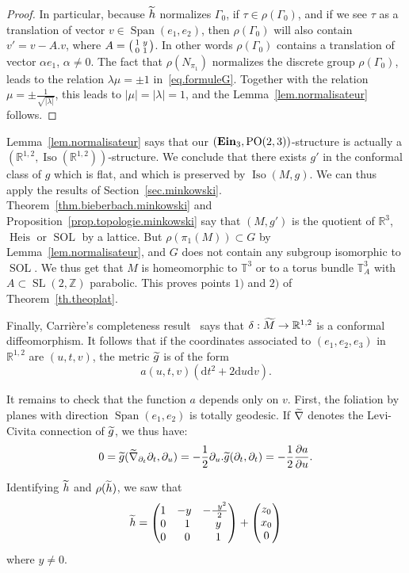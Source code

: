 \documentclass[11pt]{article}
\theoremstyle{definition}
\numberwithin{equation}{section}
\numberwithin{figure}{section}
\numberwithin{table}{section}
\DeclareMathOperator{\Iso}{Iso}
\DeclareMathOperator{\SL}{SL}
\DeclareMathOperator{\Sol}{SOL}
\DeclareMathOperator{\ein}{{\bf Ein}_3}
\DeclareMathOperator{\Span}{Span}
\DeclareMathOperator{\Heis}{Heis}
\newcommand{\tm}{\tilde{{M}}}
\newcommand{\tth}{\tilde{h}}
\newcommand*\TT{\mathbb{T}}
\newcommand*\RR{\mathbb{R}}
\newcommand*\ZZ{\mathbb{Z}}
\DeclareMathOperator{\POop}{PO}
\newcommand{\PO}{{\POop(2,3)}}
\let\oldtilde\tilde
\renewcommand*\tilde[1]{\mathchoice{\widetilde{#1}}{\widetilde{#1}}{\widetilde{#1}}{\oldtilde{#1}}}
\newenvironment{smallpmatrix}{\left(\begin{smallmatrix}}{\end{smallmatrix}\right)}
\newcommand*{\dd}{\mathrm{d}}
\newcommand*{\dt}{\dd t}
\newcommand*{\du}{\dd u}
\newcommand*{\dv}{\dd v}
\begin{document}
\begin{proof}
In particular, because $\tth$ normalizes $\Gamma_0$, if $\tau \in \rho(\Gamma_0)$, and if we see $\tau$ as a translation of vector $v \in \Span(e_1,e_2)$, then $\rho(\Gamma_0)$ will also contain $v'=v-A.v$, where \linebreak$A=
\begin{smallpmatrix} 1&y\\0&1\end{smallpmatrix}$. In other words $\rho(\Gamma_0)$ contains a translation of vector $\alpha e_1$, $\alpha \not =0$. The fact that $\rho(N_{\pi_1})$ normalizes the discrete group $\rho(\Gamma_0)$, leads to the relation $\lambda \mu =\pm 1$ in~\eqref{eq.formuleG}. Together with the relation $\mu= \pm \frac{1}{\sqrt{|\lambda|}}$, this leads to $|\mu|=|\lambda|=1$, and the Lemma~\ref{lem.normalisateur} follows.
\end{proof}

Lemma~\ref{lem.normalisateur} says that our $(\ein,\PO)$-structure is actually a $(\RR^{1,2},\Iso(\RR^{1,2}))$-structure. We conclude that there exists $g'$ in the conformal class of $g$ which is flat, and which is preserved by $\Iso(M,g)$. We can thus apply the results of Section~\ref{sec.minkowski}. Theorem~\ref{thm.bieberbach.minkowski} and Proposition~\ref{prop.topologie.minkowski} say that $(M,g')$ is the quotient of $\RR^3$, $\Heis$ or $\Sol$ by a lattice. But $\rho(\pi_1(M)) \subset G$ by Lemma~\ref{lem.normalisateur}, and $G$ does not contain any subgroup isomorphic to $\Sol$. We thus get that $M$ is homeomorphic to $\TT^3$ or to a torus bundle $\TT_A^3$ with $A \subset \SL(2,\ZZ)$ parabolic. This proves points $1)$ and $2)$ of Theorem~\ref{th.theoplat}.



Finally, Carrière's completeness result~\cite{carriere} says that $\delta: \tm \to \RR^{1,2}$ is a conformal diffeomorphism. It follows that if the coordinates associated to $(e_1,e_2,e_3)$ in $\RR^{1,2}$ are $(u,t,v)$, the metric $\tilde{g}$ is of the form
\[
a(u,t,v)(\dt^2+2\du\dv).
\]


It remains to check that the function $a$ depends only on $v$. First, the foliation by planes with direction $\Span(e_1,e_2)$ is totally geodesic. If $\tilde{\nabla}$ denotes the Levi-Civita connection of $\tilde{g}$, we thus have:
\[
0=\tilde{g}(\tilde{\nabla}_{\partial_t}\partial_t,\partial_u)=
-\frac{1}{2}\partial_u.\tilde{g}(\partial_t,\partial_t)=
-\frac{1}{2}\frac{\partial a}{\partial u}.
\]

Identifying $\tth$ and $\rho(\tth)$, we saw that
\[
\tth=\begin{pmatrix}
1&- y&-\frac{\;\;y^2}{2 }\\ 0&\;\;1 &\;\;y\\0&\;\;0&\;\;1\\
\end{pmatrix} +
\begin{pmatrix} z_0 \\ x_0 \\ 0 \\
\end{pmatrix}
\]
where $y \not =0$.
\end{document}
